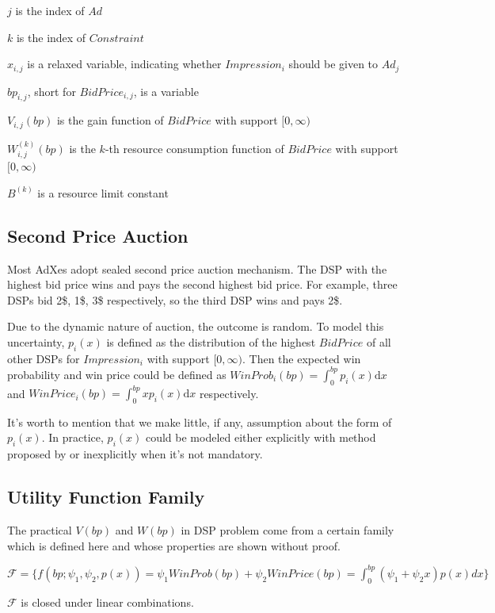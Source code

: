 \documentclass[sigconf]{acmart}
\newcommand{\sx}{x_{i,j}}
\newcommand{\sbp}{bp_{i,j}}
\newcommand{\sV}{V_{i,j}}
\newcommand{\sW}{W_{i,j}^{(k)}}
\newcommand{\sB}{B^{(k)}}
\newcommand{\pprob}{\psi_1}
\newcommand{\pprice}{\psi_2}
\newcommand{\uff}{\mathscr{F}}
\newcommand{\uf}{f(bp; \pprob, \pprice, p(x))}
\begin{document}
$j$ is the index of $Ad$

$k$ is the index of $Constraint$

$\sx$ is a relaxed variable, indicating whether $Impression_i$ should be given to $Ad_j$

$\sbp$, short for $BidPrice_{i,j}$, is a variable

$\sV(bp)$ is the gain function of $BidPrice$ with support $[0, \infty)$

$\sW(bp)$ is the $k$-th resource consumption function of $BidPrice$ with support $[0, \infty)$

$\sB$ is a resource limit constant

\subsection{Second Price Auction}

Most AdXes adopt sealed second price auction mechanism.
The DSP with the highest bid price wins and pays the second highest bid price.
For example, three DSPs bid 2\$, 1\$, 3\$ respectively, so the third DSP wins and pays 2\$. 

Due to the dynamic nature of auction, the outcome is random.
To model this uncertainty, $p_i(x)$ is defined as
    the distribution of the highest $BidPrice$ of all other DSPs for $Impression_i$ with support $[0, \infty)$.
Then the expected win probability and win price could be defined as
    $WinProb_i(bp)=\int_0^{bp} p_i(x) \mathrm{d} x$ and $WinPrice_i(bp)=\int_0^{bp} x p_i(x) \mathrm{d} x$ respectively.

It's worth to mention that we make little, if any, assumption about the form of $p_i(x)$.
In practice, $p_i(x)$ could be modeled either explicitly with method proposed by \cite{Wu2015} or inexplicitly when it's not mandatory.

\subsection{Utility Function Family}

The practical $V(bp)$ and $W(bp)$ in DSP problem come from a certain family
    which is defined here and whose properties are shown without proof.

\begin{definition}
$\uff = \{ \uf = \pprob WinProb(bp) + \pprice WinPrice(bp) = \int_0^{bp} (\pprob + \pprice x)p(x)dx \} $
\end{definition}

\begin{theorem}
$\uff$ is closed under linear combinations.
\end{theorem}
\end{document}
